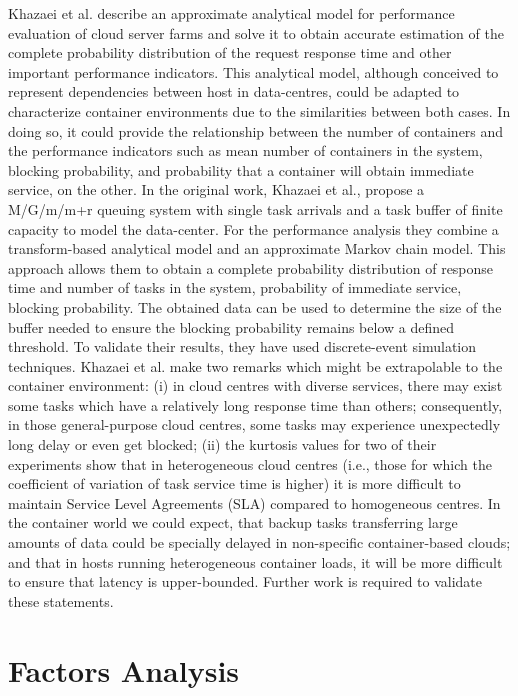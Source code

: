 \documentclass[conference]{IEEEtran}
\begin{document}
Khazaei et al. \cite{IEEE_2012:Khazaei} describe an approximate analytical model for performance evaluation of cloud server farms and solve it to obtain accurate estimation of the complete probability distribution of the request response time and other important performance indicators. This analytical model, although conceived to represent dependencies between host in data-centres, could be adapted to characterize container environments due to the similarities between both cases. In doing so, it could provide the relationship between the number of containers and the performance indicators such as mean number of containers in the system, blocking probability, and probability that a container will obtain immediate service, on the other. In the original work, Khazaei et al., propose a M/G/m/m+r queuing system with single task arrivals and a task buffer of finite capacity to model the data-center. For the performance analysis they combine a transform-based analytical model and an approximate Markov chain model. This approach allows them to obtain a complete probability distribution of response time and number of tasks in the system, probability of immediate service, blocking probability. The obtained data can be used to determine the size of the buffer needed to ensure the blocking probability remains below a defined threshold. To validate their results, they have used discrete-event simulation techniques. Khazaei et al. make two remarks which might be extrapolable to the container environment: (i) in cloud centres with diverse services, there may exist some tasks which have a relatively long response time than others; consequently, in those general-purpose cloud centres, some tasks may experience unexpectedly long delay or even get blocked; (ii) the kurtosis values for two of their experiments show that in heterogeneous cloud centres (i.e., those for which the coefficient of variation of task service time is higher) it is more difficult to maintain Service Level Agreements (SLA) compared to homogeneous centres. In the container world we could expect, that backup tasks transferring large amounts of data could be specially delayed in non-specific container-based clouds; and that in hosts running heterogeneous container loads, it will be more difficult to ensure that latency is upper-bounded. Further work is required to validate these statements.


\section{Factors Analysis}
\end{document}
